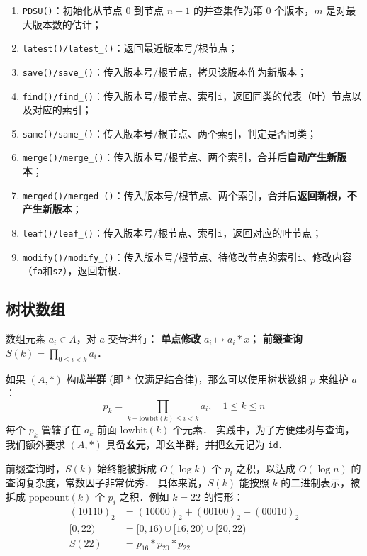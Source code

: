 \begin{enumerate}[noitemsep]
    \item {\tt PDSU()}：初始化从节点 $0$ 到节点 $n - 1$ 的并查集作为第 $0$ 个版本，$m$ 是对最大版本数的估计；
    \item {\tt latest()/latest\_()}：返回最近版本号/根节点；
    \item {\tt save()/save\_()}：传入版本号/根节点，拷贝该版本作为新版本；
    \item {\tt find()/find\_()}：传入版本号/根节点、索引{\tt i}，返回同类的代表（叶）节点以及对应的索引；
    \item {\tt same()/same\_()}：传入版本号/根节点、两个索引，判定是否同类；
    \item {\tt merge()/merge\_()}：传入版本号/根节点、两个索引，合并后{\bf 自动产生新版本}；
    \item {\tt merged()/merged\_()}：传入版本号/根节点、两个索引，合并后{\bf 返回新根，不产生新版本}；
    \item {\tt leaf()/leaf\_()}：传入版本号/根节点、索引{\tt i}，返回对应的叶节点；
    \item {\tt modify()/modify\_()}：传入版本号/根节点、待修改节点的索引{\tt i}、修改内容（{\tt fa}和{\tt sz}），返回新根．
\end{enumerate}

\newpage



\subsection{树状数组}

数组元素 $a_i \in A$，对 $a$ 交替进行：
{\bf 单点修改} $a_i \mapsto a_i * x$；
{\bf 前缀查询} $S(k) = \prod_{0 \le i < k} a_i$．

如果 $(A, *)$ 构成{\bf 半群} (即 $*$ 仅满足结合律)，那么可以使用树状数组 $p$ 来维护 $a$：
$$
p_k = \prod_{k - \text{lowbit}(k) \le i < k} a_i, \quad
1 \le k \le n
$$
每个 $p_k$ 管辖了在 $a_k$ 前面 $\text{lowbit}(k)$ 个元素．
实践中，为了方便建树与查询，我们额外要求 $(A, *)$ 具备{\bf 幺元}，即幺半群，并把幺元记为 {\tt id}．

前缀查询时，$S(k)$ 始终能被拆成 $O(\log k)$ 个 $p_i$ 之积，以达成 $O(\log n)$ 的查询复杂度，常数因子非常优秀．
具体来说，$S(k)$ 能按照 $k$ 的二进制表示，被拆成 $\text{popcount}(k)$ 个 $p_i$ 之积．例如 $k = 22$ 的情形：
$$
\begin{aligned}
    (10110)_2 &= (10000)_2 + (00100)_2 + (00010)_2 \\
    [0, 22) &= [0, 16) \cup [16, 20) \cup [20, 22) \\
    S(22) &= p_{16} * p_{20} * p_{22}
\end{aligned}
$$

